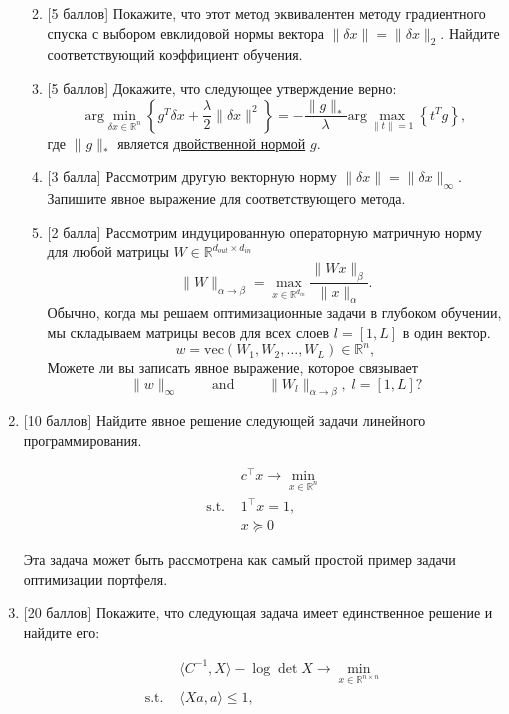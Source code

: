 \documentclass[
  russian,
  letterpaper,
  DIV=11,
  numbers=noendperiod]{scrartcl}
\providecommand{\tightlist}{%
  \setlength{\itemsep}{0pt}\setlength{\parskip}{0pt}}
\begin{document}
\begin{enumerate}
  \begin{enumerate}
  \def\labelenumii{\arabic{enumii}.}
  \tightlist
  \item
    {[}5 баллов{]} Покажите, что этот метод эквивалентен методу
    градиентного спуска с выбором евклидовой нормы вектора
    \(\|\delta x\| = \|\delta x\|_2\). Найдите соответствующий
    коэффициент обучения.
  \item
    {[}5 баллов{]} Докажите, что следующее утверждение верно: \[
     \text{arg}\min_{\delta x \in \mathbb{R}^n} \left\{ g^T\delta x + \frac{\lambda}{2} \|\delta x\|^2\right\} = - \frac{\|g\|_*}{\lambda} \text{arg}\max_{\|t\|=1} \left\{ t^T g \right\},
     \] где \(\|g\|_*\) является
    \href{https://fmin.xyz/docs/theory/Dual\%20norm.html}{двойственной
    нормой} \(g\).
  \item
    {[}3 балла{]} Рассмотрим другую векторную норму
    \(\|\delta x\| = \|\delta x\|_\infty\). Запишите явное выражение для
    соответствующего метода.
  \item
    {[}2 балла{]} Рассмотрим индуцированную операторную матричную норму
    для любой матрицы \(W \in \mathbb{R}^{d_{out} \times d_{in}}\) \[
     \|W\|_{\alpha \to \beta} = \max_{x \in \mathbb{R}^{d_{in}}} \frac{\|Wx\|_{\beta}}{\|x\|_{\alpha}}.
     \] Обычно, когда мы решаем оптимизационные задачи в глубоком
    обучении, мы складываем матрицы весов для всех слоев \(l = [1, L]\)
    в один вектор. \[
     w = \text{vec}(W_1, W_2, \ldots, W_L) \in \mathbb{R}^{n},
     \] Можете ли вы записать явное выражение, которое связывает \[
     \|w\|_\infty \qquad \text{ and } \qquad \|W_l\|_{\alpha \to \beta}, \; l = [1, L]?
     \]
  \end{enumerate}
\item
  {[}10 баллов{]} Найдите явное решение следующей задачи линейного
  программирования.

  \[
   \begin{split}
   & c^\top x \to \min\limits_{x \in \mathbb{R}^n }\\
   \text{s.t. } & 1^\top x = 1, \\
   & x \succeq 0 
   \end{split}
   \]

  Эта задача может быть рассмотрена как самый простой пример задачи
  оптимизации портфеля.
\item
  {[}20 баллов{]} Покажите, что следующая задача имеет единственное
  решение и найдите его:

  \[
   \begin{split}
   & \langle C^{-1}, X\rangle - \log \det X \to \min\limits_{x \in \mathbb{R}^{n \times n} }\\
   \text{s.t. } & \langle Xa, a\rangle \leq 1,
   \end{split}
   \]


\end{enumerate}
\end{document}
